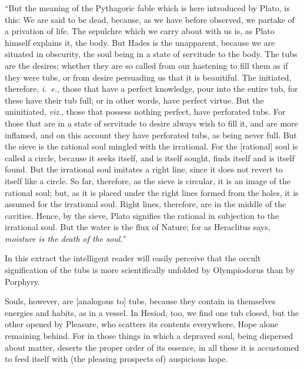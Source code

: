 \documentclass[a4paper,12pt]{article}
\begin{document}
{``But the meaning of the Pythagoric fable which is here introduced by Plato, is
this: We are said to be dead, because, as we have before observed, we partake
of a privation of life. The sepulchre which we carry about with us is, as Plato
himself explains it, the body. But Hades is the unapparent, because we are
situated in obscurity, the soul being in a state of servitude to the body. The
tubs are the desires; whether they are so called from our hastening to fill
them as if they were tubs, or from desire persuading us that it is beauitiful.
The initiated, therefore, \textit{i.~e.,} those that have a perfect knowledge,
pour into the entire tub, for these have their tub full; or in other words,
have perfect virtue. But the uninitiated, \textit{viz.}, those that possess
nothing perfect, have perforated tubs. For those that are in a state of
servitude to desire always wish to fill it, and are more inflamed, and on this
account they have perforated tubs, as being never full. But the sieve is the
rational soul mingled with the irrational. For the [rational] soul is called a
circle, because it seeks itself, and is itself sought, finds itself and is
itself found. But the irrational soul imitates a right line, since it does not
revert to itself like a circle. So far, therefore, as the sieve is circular, it
is an image of the rational soul; but, as it is placed under the right lines
formed from the holes, it is assumed for the irrational soul. Right lines,
therefore, are in the middle of the cavities. Hence, by the sieve, Plato
signifies the rational in subjection to the irrational soul. But the water is
the flux of Nature; for as Heraclitus says, \textit{moisture is the death of
the soul.}''

In this extract the intelligent reader will easily perceive that the occult
signification of the tubs is more scientifically unfolded by Olympiodorus than
by Porphyry.} Souls, however, are [analogous to] tubs, because they contain in
themselves energies and habits, as in a vessel. In Hesiod, too, we find one tub
closed, but the other opened by Pleasure, who scatters its contents everywhere,
Hope alone remaining behind. For in those things in which a depraved soul,
being dispersed about matter, deserts the proper order of its essence, in all
these it is accustomed to feed itself with (the pleasing prospects of)
auspicious hope.
\end{document}
